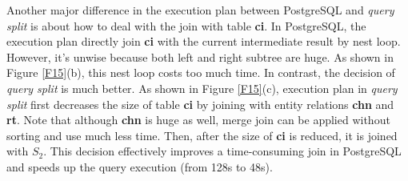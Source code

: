     Another major difference in the execution plan between PostgreSQL and \textit{query split} is about how to deal with the join with table \textbf{ci}. In PostgreSQL, the execution plan directly join \textbf{ci} with the current intermediate result by nest loop. However, it's unwise because both left and right subtree are huge. As shown in Figure \ref{F15}(b), this nest loop costs too much time. In contrast, the decision of \textit{query split} is much better. As shown in Figure \ref{F15}(c), execution plan in \textit{query split} first decreases the size of table \textbf{ci} by joining with entity relations \textbf{chn} and \textbf{rt}. Note that although \textbf{chn} is huge as well, merge join can be applied without sorting and use much less time. Then, after the size of \textbf{ci} is reduced, it is joined with $S_2$. This decision effectively improves a time-consuming join in PostgreSQL and speeds up the query execution (from 128s to 48s).

